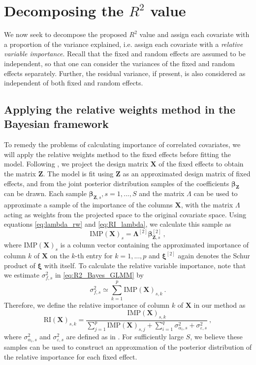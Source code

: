     
    


\section{Decomposing the \texorpdfstring{$R^2$}{Lg} value}
We now seek to decompose the proposed $R^2$ value and assign each covariate with a proportion of the variance explained, i.e. assign each covariate with a \textit{relative variable importance}. Recall that the fixed and random effects are assumed to be independent, so that one can consider the variances of the fixed and random effects separately. Further, the residual variance, if present, is also considered as independent of both fixed and random effects. 
\subsection{Applying the relative weights method in the Bayesian framework}
To remedy the problems of calculating importance of correlated covariates, we will apply the relative weights method to the fixed effects before fitting the model. Following , we project the design matrix $\mathbf{X}$ of the fixed effects to obtain the matrix $\mathbf{Z}$. The model is fit using $\mathbf{Z}$ as an approximated design matrix of fixed effects, and from the joint posterior distribution samples of the coefficients $\boldsymbol{\beta}_{\mathbf{Z}}$ can be drawn. Each sample $\boldsymbol{\beta}_{\mathbf{Z}, s}, s=1, ..., S$ and the matrix $\Lambda$ can be used to approximate a sample of the importance of the columns $\mathbf{X}$, with the matrix $\Lambda$ acting as weights from the projected space to the original covariate space. Using equations \eqref{eq:lambda_rw} and \eqref{eq:RI_lambda}, we calculate this sample as
\begin{equation}
    \text{IMP}(\mathbf{X})_s = \boldsymbol{\Lambda}^{[2]} \boldsymbol{\beta}_{\mathbf{Z}, s}^{[2]} \ ,
\end{equation}
where $\text{IMP}(\mathbf{X})_s$ is a column vector containing the approximated importance of column $k$ of $\mathbf{X}$ on the $k$-th entry for $k=1, ..., p$ and $\boldsymbol{\xi}^{[2]}$ again denotes the Schur product of $\boldsymbol{\xi}$ with itself. To calculate the relative variable importance, note that we estimate $\sigma^2_{f, s}$ in \eqref{eq:R2_Bayes_GLMM} by
\begin{equation}
    \sigma^2_{f, s} \simeq \sum_{k=1}^{p}\text{IMP}(\mathbf{X})_{s, k}  \ . 
\end{equation}
Therefore, we define the relative importance of column $k$ of $\mathbf{X}$ in our method as
\begin{equation}
    \label{eq:RI_X}
    \text{RI}(\mathbf{X})_{s, k} = \frac{\text{IMP}(\mathbf{X})_{s, k}}{\sum_{j=1}^{p}\text{IMP}(\mathbf{X})_{s, j} + \sum_{i=1}^q \sigma_{\alpha_i, s}^2 + \sigma_{\varepsilon, s}^2} \ ,
\end{equation}
where $\sigma_{\alpha_i, s}^2$ and  $\sigma_{\varepsilon, s}^2$ are defined as in .
For sufficiently large $S$, we believe these samples can be used to construct an approxmation of the posterior distribution of the relative importance for each fixed effect. 

